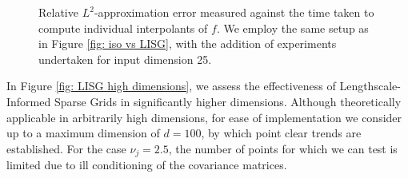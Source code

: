\documentclass[pdflatex,sn-mathphys-num]{sn-jnl}%
\theoremstyle{thmstyleone}%
\theoremstyle{thmstyletwo}%
\theoremstyle{thmstylethree}%
\begin{document}
\begin{figure}[h]
\begin{subfigure}{.45\textwidth}
    \end{subfigure}
    \hspace{10mm}
    \begin{subfigure}{.45\textwidth}
    \end{subfigure}
    \caption{Relative \(L^2\)-approximation error measured against the time taken to compute individual interpolants of \(f\). We employ the same setup as in Figure \ref{fig: iso vs LISG}, with the addition of experiments undertaken for input dimension 25.}
    \label{fig: LISG time}
\end{figure}

In Figure \ref{fig: LISG high dimensions}, we assess the effectiveness of Lengthscale-Informed Sparse Grids in significantly higher dimensions. Although theoretically applicable in arbitrarily high dimensions, for ease of implementation we consider up to a maximum dimension of \(d=100\), by which point clear trends are established. For the case \(\nu_j=2.5\), the number of points for which we can test is limited due to ill conditioning of the covariance matrices. 
\end{document}
